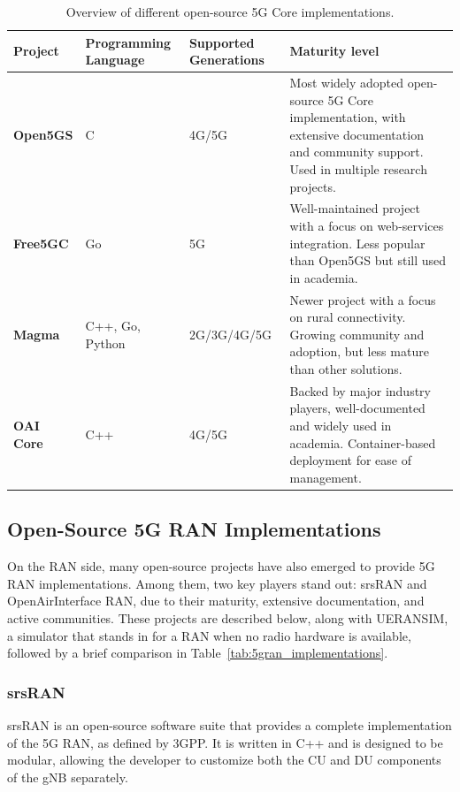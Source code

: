 \begin{table}[htbp]
\centering
\footnotesize
\begin{tabularx}{\textwidth}{|l|p{2.2cm}|p{2.1cm}|p{7.5cm}|}
\hline
\rowcolor{gray!30}
\textbf{Project} & \textbf{Programming Language} & \textbf{Supported Generations} & \textbf{Maturity level}\\ \hline
\textbf{Open5GS} & C & 4G/5G & Most widely adopted open-source 5G Core implementation, with extensive documentation and community support. Used in multiple research projects. \\ \hline
\textbf{Free5GC} & Go & 5G & Well-maintained project with a focus on web-services integration. Less popular than Open5GS but still used in academia.\\ \hline
\textbf{Magma} & C++, Go, Python & 2G/3G/4G/5G & Newer project with a focus on rural connectivity. Growing community and adoption, but less mature than other solutions.\\ \hline
\textbf{\gls{OAI} Core} & C++ & 4G/5G & Backed by major industry players, well-documented and widely used in academia. Container-based deployment for ease of management.\\ \hline
\end{tabularx}
\caption{Overview of different open-source 5G Core implementations.}
\label{tab:5gcore_implementations}
\end{table}

\subsection{Open-Source 5G RAN Implementations}
\label{sec:open_source_5g_ran_implementations}
On the \gls{RAN} side, many open-source projects have also emerged to provide 5G \gls{RAN} implementations. Among them, two key players stand out: srsRAN and OpenAirInterface \gls{RAN}, due to their maturity, extensive documentation, and active communities. These projects are described below, along with UERANSIM, a simulator that stands in for a \gls{RAN} when no radio hardware is available, followed by a brief comparison in Table~\ref{tab:5gran_implementations}.
\subsubsection{srsRAN}
\label{sec:srsran}

srsRAN \cite{ocudu_project} is an open-source software suite that provides a complete implementation of the 5G \gls{RAN}, as defined by \gls{3GPP}. It is written in C++ and is designed to be modular, allowing the developer to customize both the \gls{CU} and \gls{DU} components of the \gls{gNB} separately.

